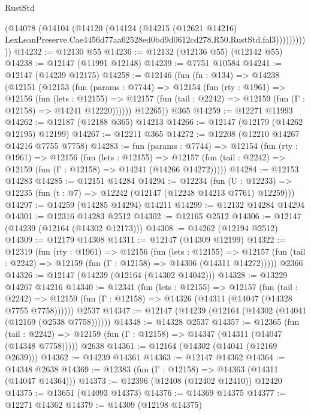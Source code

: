 \begin{lexlean}{RustStd}
\begin{coremodule}
                (@14078
                  (@14104
                    (@14120
                      (@14124
                        (@14215
                          (@12621 @14216)
                          LexLeanPreserve.Cae4456d77aa62528ed0bd9d0612cd278.R50.RustStd.fal3)))))))))))
@14232 := @12130 @55
@14236 := @12132 (@12136 @55) (@12142 @55)
@14238 := @12147 (@11991 @12148)
@14239 := @7751 @10584
@14241 := @12147 (@14239 @12175)
@14258 := @12146
    (fun (fn : @134) =>
    @14238
      (@12151
        (@12153
          (fun (params : @7744) =>
          @12154
            (fun (rty : @1961) =>
            @12156
              (fun (lets : @12155) =>
              @12157 (fun (tail : @2242) => @12159 (fun (Γ : @12158) => @14241 @12220))))))
        @12265))
    @365
@14259 := @12271 @11993
@14262 := @12187 (@12188 @365) @14213
@14266 := @12147 (@12179 (@14262 @12195) @12199)
@14267 := @12211 @365
@14272 := @12208 (@12210 @14267 @14216 @7755 @7758)
@14283 := fun (params : @7744) =>
  @12154
    (fun (rty : @1961) =>
    @12156
      (fun (lets : @12155) =>
      @12157 (fun (tail : @2242) => @12159 (fun (Γ : @12158) => @14241 (@14266 @14272)))))
@14284 := @12153 @14283
@14285 := @12151 @14284
@14294 := @12234
    (fun (U : @12233) => @12235 (fun (t : @7) => @12242 (@12147 (@12248 @14213 @7761) @12259)))
@14297 := @14259 (@14285 @14294) @14211
@14299 := @12132 @14284 @14294
@14301 := @12316 @14283 @2512
@14302 := @12165 @2512
@14306 := @12147 (@14239 (@12164 (@14302 @12173)))
@14308 := @14262 (@12194 @2512)
@14309 := @12179 @14308
@14311 := @12147 (@14309 @12199)
@14322 := @12319
    (fun (rty : @1961) =>
    @12156
      (fun (lets : @12155) =>
      @12157 (fun (tail : @2242) => @12159 (fun (Γ : @12158) => @14306 (@14311 @14272)))))
    @2366
@14326 := @12147 (@14239 (@12164 (@14302 @14042)))
@14328 := @13229 @14267 @14216
@14340 := @12341
    (fun (lets : @12155) =>
    @12157
      (fun (tail : @2242) =>
      @12159 (fun (Γ : @12158) => @14326 (@14311 (@14047 (@14328 @7755 @7758))))))
    @2537
@14347 := @12147 (@14239 (@12164 (@14302 (@14041 (@12169 (@2538 @7758))))))
@14348 := @14328 @2537
@14357 := @12365
    (fun (tail : @2242) => @12159 (fun (Γ : @12158) => @14347 (@14311 (@14047 (@14348 @7758)))))
    @2638
@14361 := @12164 (@14302 (@14041 (@12169 @2639)))
@14362 := @14239 @14361
@14363 := @12147 @14362
@14364 := @14348 @2638
@14369 := @12383 (fun (Γ : @12158) => @14363 (@14311 (@14047 @14364)))
@14373 := @12396 (@12408 (@12402 @12410)) @12420
@14375 := @13651 (@14093 @14373)
@14376 := @14369 @14375
@14377 := @12271 @14362
@14379 := @14309 (@12198 @14375)

\end{coremodule}
\end{lexlean}
